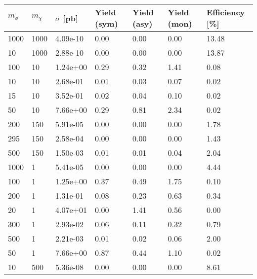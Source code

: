\begin{table}
\small
\label{summaryTableAN_DMbbS_xs10_2p1fb_exp}
\centering
\begin{tabular}{lllllll}
\hline
$m_\phi$ & $m_\chi$ & $\sigma$ [pb] & Yield (sym) & Yield (asy) & Yield (mon) & Efficiency [\%] \\ \hline
1000      &   1000      &   4.09e-10  &   0.00      &   0.00      &   0.00      &   13.48     \\ 
10        &   1000      &   2.88e-10  &   0.00      &   0.00      &   0.00      &   13.87     \\ 
100       &   10        &   1.24e+00  &   0.29      &   0.32      &   1.41      &   0.08      \\ 
10        &   10        &   2.68e-01  &   0.01      &   0.03      &   0.07      &   0.02      \\ 
15        &   10        &   3.52e-01  &   0.02      &   0.04      &   0.10      &   0.02      \\ 
50        &   10        &   7.66e+00  &   0.29      &   0.81      &   2.34      &   0.02      \\ 
200       &   150       &   5.91e-05  &   0.00      &   0.00      &   0.00      &   1.78      \\ 
295       &   150       &   2.58e-04  &   0.00      &   0.00      &   0.00      &   1.43      \\ 
500       &   150       &   1.50e-03  &   0.01      &   0.01      &   0.04      &   2.04      \\ 
1000      &   1         &   5.41e-05  &   0.00      &   0.00      &   0.00      &   4.44      \\ 
100       &   1         &   1.25e+00  &   0.37      &   0.49      &   1.75      &   0.10      \\ 
200       &   1         &   1.31e-01  &   0.08      &   0.23      &   0.63      &   0.34      \\ 
20        &   1         &   4.07e+01  &   0.00      &   1.41      &   0.56      &   0.00      \\ 
300       &   1         &   2.93e-02  &   0.06      &   0.11      &   0.32      &   0.79      \\ 
500       &   1         &   2.21e-03  &   0.01      &   0.02      &   0.06      &   2.00      \\ 
50        &   1         &   7.66e+00  &   0.87      &   0.44      &   1.10      &   0.02      \\ 
10        &   500       &   5.36e-08  &   0.00      &   0.00      &   0.00      &   8.61      \\ 

\end{tabular}
\end{table}

